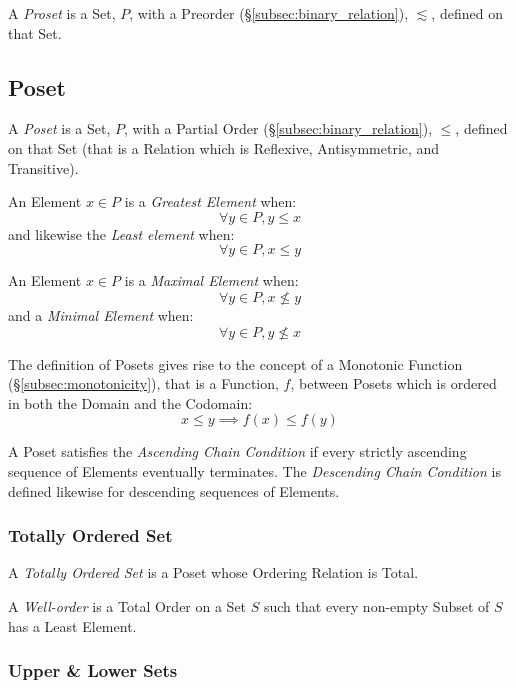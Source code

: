 \documentclass{article}
\begin{document}
A \emph{Proset} is a Set, $P$, with a Preorder
(\S\ref{subsec:binary_relation}), $\lesssim$, defined on that Set.



\subsection{Poset}\label{subsec:poset}

A \emph{Poset} is a Set, $P$, with a Partial Order
(\S\ref{subsec:binary_relation}), $\leq$, defined on that Set (that is
a Relation which is Reflexive, Antisymmetric, and Transitive).

An Element $x \in P$ is a \emph{Greatest Element} when:
\[
    \forall y \in P, y \leq x
\]
and likewise the \emph{Least element} when:
\[
    \forall y \in P, x \leq y
\]

An Element $x \in P$ is a \emph{Maximal Element} when:
\[
    \forall y \in P, x \nleq y
\]
and a \emph{Minimal Element} when:
\[
    \forall y \in P, y \nleq x
\]

The definition of Posets gives rise to the concept of a Monotonic
Function (\S\ref{subsec:monotonicity}), that is a Function, $f$,
between Posets which is ordered in both the Domain and the Codomain:
\[
    x \leq y \implies f(x) \leq f(y)
\]

A Poset satisfies the \emph{Ascending Chain Condition} if every
strictly ascending sequence of Elements eventually terminates. The
\emph{Descending Chain Condition} is defined likewise for descending
sequences of Elements.



\subsubsection{Totally Ordered Set}\label{subsec:total_order}

A \emph{Totally Ordered Set} is a Poset whose Ordering Relation is
Total.

A \emph{Well-order} is a Total Order on a Set $S$ such that every
non-empty Subset of $S$ has a Least Element.



\subsubsection{Upper \& Lower Sets}\label{subsec:upper_lower}
\end{document}

